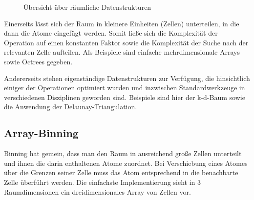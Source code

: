 \begin{figure}[bhpt]
  \caption{Übersicht über räumliche Datenstrukturen}
  \label{fig:datastructures}
\end{figure}

Einerseits lässt sich der Raum in kleinere Einheiten (Zellen) unterteilen, in die dann die Atome eingefügt werden.
Somit ließe sich die Komplexität der Operation auf einen konstanten Faktor sowie die Komplexität der Suche nach der relevanten Zelle aufteilen.
Als Beispiele sind einfache mehrdimensionale Arrays sowie Octrees gegeben.

Andererseits stehen eigenständige Datenstrukturen zur Verfügung, die hinsichtlich einiger der Operationen optimiert wurden und inzwischen Standardwerkzeuge in verschiedenen Disziplinen geworden sind.
Beispiele sind hier der k-d-Baum sowie die Anwendung der Delaunay-Triangulation.

\subsection{Array-Binning}

Binning hat gemein, dass man den Raum in ausreichend große Zellen unterteilt und ihnen die darin enthaltenen Atome zuordnet.
Bei Verschiebung eines Atomes über die Grenzen seiner Zelle muss das Atom entsprechend in die benachbarte Zelle überführt werden.
Die einfachste Implementierung sieht in 3 Raumdimensionen ein dreidimensionales Array von Zellen vor.

